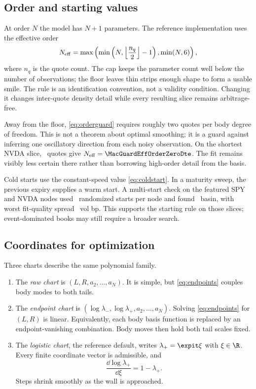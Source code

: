 \subsection{Order and starting values}
\label{sec:orderguard}

At order $N$ the model has $N+1$ parameters.  The reference implementation
uses the effective order
\begin{equation}
N_{\rm eff}=\max\left(
\min\left(N,\left\lfloor\frac{n_q}{2}\right\rfloor-1\right),
\min(N,6)\right),
\label{eq:orderguard}
\end{equation}
where $n_q$ is the quote count.  The cap keeps the parameter count well below
the number of observations; the floor leaves thin strips enough shape to form
a usable smile.  The rule is an identification convention, not a validity
condition.  Changing it changes inter-quote density detail while every
resulting slice remains arbitrage-free.

Away from the floor, \eqref{eq:orderguard} requires roughly two quotes per
body degree of freedom.  This is not a theorem about optimal smoothing; it is
a guard against inferring one oscillatory direction from each noisy
observation.  On the shortest NVDA slice,
\MacGuardQuoteCountZeroDte\ quotes give
$N_{\rm eff}=\MacGuardEffOrderZeroDte$.  The fit remains visibly less certain
there rather than borrowing high-order detail from the basis.

Cold starts use the constant-speed value \eqref{eq:coldstart}.  In a maturity
sweep, the previous expiry supplies a warm start.  A multi-start check on the
featured SPY and NVDA nodes used \MacMultiStartCount\ randomized starts per
node and found \MacMultiStartBasins\ basin, with worst fit-quality spread
\MacMultiStartWorstDIvBp\ vol bp.  This supports the starting rule on those
slices; event-dominated books may still require a broader search.

\subsection{Coordinates for optimization}
\label{sec:charts}

Three charts describe the same polynomial family.

\begin{enumerate}
\item The \emph{raw chart} is $(L,R,a_2,\ldots,a_N)$.  It is simple, but
\eqref{eq:endpoints} couples body modes to both tails.
\item The \emph{endpoint chart} is
$(\log\lambda_-,\log\lambda_+,a_2,\ldots,a_N)$.  Solving
\eqref{eq:endpoints} for $(L,R)$ is linear.  Equivalently, each body basis
function is replaced by an endpoint-vanishing combination.  Body moves then
hold both tail scales fixed.
\item The \emph{logistic chart}, the reference default, writes
$\lambda_+=\expit\xi$ with $\xi\in\R$.  Every finite coordinate vector is
admissible, and
\begin{equation}
\frac{\dd\log\lambda_+}{\dd\xi}=1-\lambda_+.
\label{eq:chartcompression}
\end{equation}
Steps shrink smoothly as the wall is approached.
\end{enumerate}

